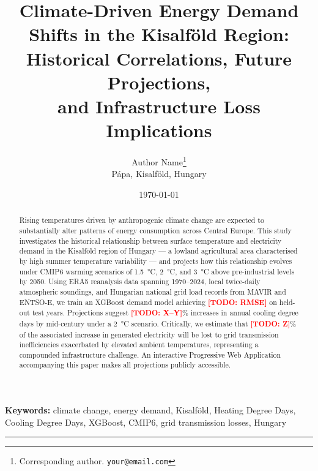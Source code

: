 \documentclass[11pt,a4paper]{article}
\newcommand{\todo}[1]{\textcolor{red}{\textbf{[TODO: #1]}}}
\begin{document}
\title{Climate-Driven Energy Demand Shifts in the Kisalf\"{o}ld Region:\\
Historical Correlations, Future Projections,\\
and Infrastructure Loss Implications}

\author{
  Author Name\thanks{Corresponding author. \texttt{your@email.com}}\\
  \small P\'{a}pa, Kisalf\"{o}ld, Hungary
}

\date{\today}

\maketitle

\begin{abstract}
Rising temperatures driven by anthropogenic climate change are expected to 
substantially alter patterns of energy consumption across Central Europe. 
This study investigates the historical relationship between surface temperature 
and electricity demand in the Kisalf\"{o}ld region of Hungary --- a lowland 
agricultural area characterised by high summer temperature variability --- 
and projects how this relationship evolves under CMIP6 warming scenarios 
of \SI{1.5}{\celsius}, \SI{2}{\celsius}, and \SI{3}{\celsius} above 
pre-industrial levels by 2050. Using ERA5 reanalysis data spanning 1970--2024, 
local twice-daily atmospheric soundings, and Hungarian national grid load 
records from MAVIR and ENTSO-E, we train an XGBoost demand model achieving 
\todo{RMSE} on held-out test years. Projections suggest 
\todo{X--Y}\% increases in annual cooling degree days by mid-century under 
a \SI{2}{\celsius} scenario. Critically, we estimate that 
\todo{Z}\% of the associated increase in generated electricity will be 
lost to grid transmission inefficiencies exacerbated by elevated ambient 
temperatures, representing a compounded infrastructure challenge. 
An interactive Progressive Web Application accompanying this paper makes 
all projections publicly accessible.
\end{abstract}

\textbf{Keywords:} climate change, energy demand, Kisalf\"{o}ld, Heating 
Degree Days, Cooling Degree Days, XGBoost, CMIP6, grid transmission losses, 
Hungary

\hrule
\vspace{1em}

\end{document}
